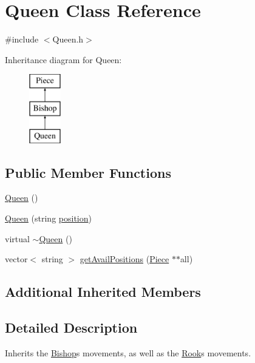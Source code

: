 \hypertarget{class_queen}{}\section{Queen Class Reference}
\label{class_queen}


{\ttfamily \#include $<$Queen.\+h$>$}

Inheritance diagram for Queen\+:\begin{figure}[H]
\begin{center}
\leavevmode
\includegraphics[height=3.000000cm]{class_queen}
\end{center}
\end{figure}
\subsection*{Public Member Functions}
\begin{DoxyCompactItemize}
\item 
\hyperlink{class_queen_ae2314f4890c7fa7d5da670b3c0b6293b}{Queen} ()
\item 
\hyperlink{class_queen_aeff77ee1186113902e6cf60ff6a6cd76}{Queen} (string \hyperlink{class_piece_a1b93d0ecc14e15fc7f3fb5def518502a}{position})
\item 
virtual \hyperlink{class_queen_aa22f6c1a49a583b549bd1f940e50721d}{$\sim$\+Queen} ()
\item 
vector$<$ string $>$ \hyperlink{class_queen_ac9d5264dfe75162fa10e717b3962fdaf}{get\+Avail\+Positions} (\hyperlink{class_piece}{Piece} $\ast$$\ast$all)
\end{DoxyCompactItemize}
\subsection*{Additional Inherited Members}


\subsection{Detailed Description}
Inherits the \hyperlink{class_bishop}{Bishop}\textquotesingle{}s movements, as well as the \hyperlink{class_rook}{Rook}\textquotesingle{}s movements. 

